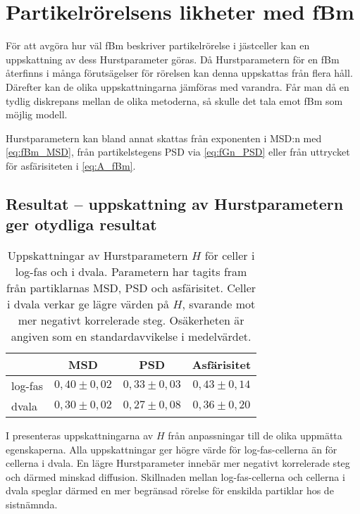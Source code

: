 \section{Partikelrörelsens likheter med fBm}

För att avgöra hur väl fBm beskriver partikelrörelse i jästceller kan en uppskattning av dess Hurstparameter göras. Då Hurstparametern för en fBm återfinns i många förutsägelser för rörelsen kan denna uppskattas från flera håll. Därefter kan de olika uppskattningarna jämföras med varandra. Får man då en tydlig diskrepans mellan de olika metoderna, så skulle det tala emot fBm som möjlig modell.

Hurstparametern kan bland annat skattas från exponenten i MSD:n med \eqref{eq:fBm_MSD}, från partikelstegens PSD via \eqref{eq:fGn_PSD} eller från uttrycket för asfärisiteten i \eqref{eq:A_fBm}. 


\subsection{Resultat -- uppskattning av Hurstparametern ger otydliga resultat}

\begin{table}
\centering
\caption{Uppskattningar av Hurstparametern $H$ för celler i log-fas och i dvala. Parametern har tagits fram från partiklarnas MSD, PSD och asfärisitet. Celler i dvala verkar ge lägre värden på $H$, svarande mot mer negativt korrelerade steg. Osäkerheten är angiven som en standardavvikelse i medelvärdet. 
}
\label{tab:H_values}
\begin{adjustbox}{center}
\begin{tabular}{l|c|c|c|}
\cline{2-4}
& MSD & PSD & Asfärisitet
\\ \hline
\multicolumn{1}{|l|}{log-fas}
& $0,40\pm 0,02$ & $0,33\pm 0,03$ %
& $0,43\pm0,14$
\\ \hline
\multicolumn{1}{|l|}{dvala}
& $0,30\pm0,02$ & $0,27\pm0,08$ & $0,36\pm 0,20$
\\ \hline
\end{tabular}
\end{adjustbox}
\end{table}

I  presenteras uppskattningarna av $H$ från anpassningar till de olika uppmätta egenskaperna. Alla uppskattningar ger högre värde för log-fas-cellerna än för cellerna i dvala. 
En lägre Hurstparameter innebär mer negativt korrelerade steg och därmed minskad diffusion. Skillnaden mellan log-fas-cellerna och cellerna i dvala speglar därmed en mer begränsad rörelse för enskilda partiklar hos de sistnämnda.

